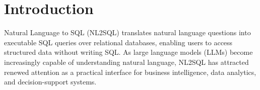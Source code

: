 \documentclass{svproc}
\begin{document}
\begin{abstract}

\end{abstract}

\section{Introduction}
\label{sec:intro}

Natural Language to SQL (NL2SQL) translates natural language questions into executable SQL queries over relational databases, enabling users to access structured data without writing SQL. As large language models (LLMs) become increasingly capable of understanding natural language, NL2SQL has attracted renewed attention as a practical interface for business intelligence, data analytics, and decision-support systems.

\end{document}
